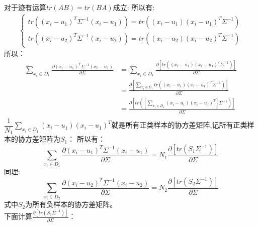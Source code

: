 \documentclass[withoutpreface,bwprint]{cumcmthesis} %
\begin{document}
	对于迹有运算$tr(AB)=tr(BA)$成立:
	所以有:
	\begin{align}
		\begin{cases}
			tr((x_i-u_1)^T\Sigma^{-1}(x_i-u_1)) =tr((x_i-u_1)(x_i-u_1)^T\Sigma^{-1})
			\\
			tr((x_i-u_2)^T\Sigma^{-1}(x_i-u_2)) =tr((x_i-u_2)(x_i-u_2)^T\Sigma^{-1})
		\end{cases}
	\end{align}
	所以：
	\begin{align*}
		\sum_{x_i \in D_1}\frac{\partial (x_i-u_1)^T\Sigma^{-1}(x_i-u_1)}{\partial \Sigma}&=\sum_{x_i \in D_1}\frac{\partial \left[ tr((x_i-u_1)(x_i-u_1)^T\Sigma^{-1}) \right]}{\partial \Sigma}\\
		&=\frac{\partial \left[\sum_{x_i \in D_1} tr((x_i-u_1)(x_i-u_1)^T\Sigma^{-1}) \right]}{\partial \Sigma}\\		
		&=\frac{\partial \left[ tr(\left[\sum_{x_i \in D_1}(x_i-u_1)(x_i-u_1)^T\right]\Sigma^{-1} ) \right]}{\partial \Sigma}\\
	\end{align*}
	$\dfrac{1}{N_1}\sum_{x_i \in D_1}(x_i-u_1)(x_i-u_1)^T$就是所有正类样本的协方差矩阵,记所有正类样本的协方差矩阵为$S_1$：
	所以有：
	\begin{equation}
		\sum_{x_i \in D_1}\frac{\partial (x_i-u_1)^T\Sigma^{-1}(x_i-u_1)}{\partial \Sigma}
		=
		N_1 \frac{\partial \left[ tr(S_1\Sigma^{-1} ) \right]}{\partial \Sigma}	
	\end{equation}
	同理:
		\begin{equation}
		\sum_{x_i \in D_2}\frac{\partial (x_i-u_2)^T\Sigma^{-1}(x_i-u_2)}{\partial \Sigma}
		=
		N_2 \frac{\partial \left[ tr(S_2\Sigma^{-1} ) \right]}{\partial \Sigma}	
	\end{equation}
	式中$S_2$为所有负样本的协方差矩阵。\\	
	下面计算$\frac{\partial \left[ tr(S_1\Sigma^{-1} ) \right]}{\partial \Sigma}$：
	
\end{document}
